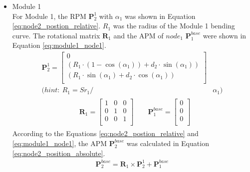 \begin{itemize}
    \item Module 1 \\
    For Module 1, the RPM $\textbf{P}_{2}^{1}$ with $\alpha_1$ was shown 
    in Equation \ref{eq:node2_postion_relative}. $R_1$ was the radius of the Module 1 bending curve. The rotational 
    matrix $\textbf{R}_{1}$ and the APM of $node_1$ $\textbf{P}_{1}^{base}$ were shown in Equation \ref*{eq:module1_node1}.
    \vspace{-5mm}
    \begin{align}
        \textbf{P}_{2}^{1} = 
        \begin{bmatrix}
            0 \\
            (R_1\cdot(1-\cos(\alpha_1)) + d_2\cdot \sin(\alpha_1)) \\
            (R_1\cdot \sin(\alpha_1) + d_2\cdot \cos(\alpha_1)) \\
        \end{bmatrix}&
        \label{eq:node2_postion_relative} \\
        \nonumber (hint: \ R_1 = {Sr}_1/ &\alpha_1)
    \end{align}
    \vspace{-15mm}
    \begin{align}
        &\begin{aligned}
            \textbf{R}_{1} = 
            \begin{bmatrix}
                1 & 0 & 0 \\
                0 & 1 & 0 \\
                0 & 0 & 1 \\
            \end{bmatrix}
            \qquad
            \textbf{P}_{1}^{base} = 
            \begin{bmatrix}
                0 \\ 0 \\ 0\\
            \end{bmatrix}
        \end{aligned}
        \label{eq:module1_node1} 
    \end{align}
    According to the Equations \ref{eq:node2_postion_relative} and \ref{eq:module1_node1}, the APM 
    $\textbf{P}_{2}^{base}$ was calculated in Equation \ref{eq:node2_position_absolute}.
    \vspace{-5mm}
    \begin{align}
        \textbf{P}_{2}^{base} = \textbf{R}_{1} \times \textbf{P}_{2}^{1} + \textbf{P}_{1}^{base}

\end{align}
\end{itemize}
